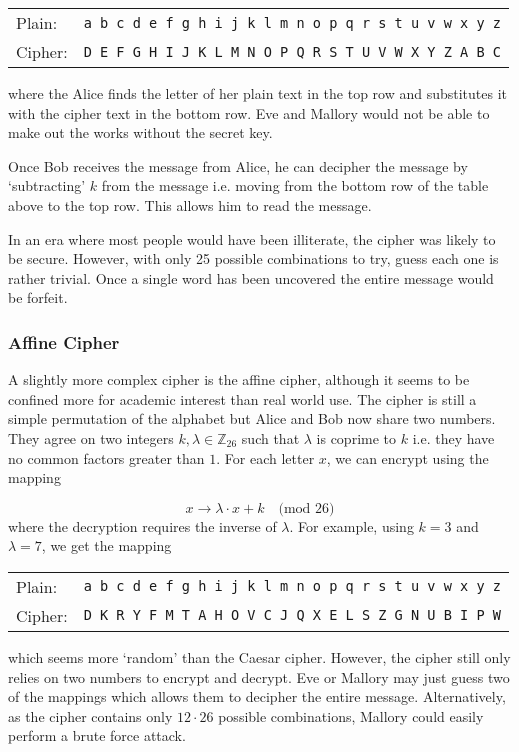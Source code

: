\begin{center}
\begin{tabular}{l l}%
	Plain:  &\quad\texttt{a b c d e f g h i j k l m n o p q r s t u v w x y z} \\ 
	Cipher: &\quad\texttt{D E F G H I J K L M N O P Q R S T U V W X Y Z A B C} \\
\end{tabular}
\end{center}
where the Alice finds the letter of her plain text in the top row and substitutes it with the cipher text in the bottom row. Eve and Mallory would not be able to make out the works without the secret key. 

Once Bob receives the message from Alice, he can decipher the message by `subtracting' $k$ from the message i.e. moving from the bottom row of the table above to the top row. This allows him to read the message.

In an era where most people would have been illiterate, the cipher was likely to be secure. However, with only 25 possible combinations to try, guess each one is rather trivial. Once a single word has been uncovered the entire message would be forfeit. 

\subsubsection*{Affine Cipher}

A slightly more complex cipher is the affine cipher, although it seems to be confined more for academic interest than real world use. The cipher is still a simple permutation of the alphabet but Alice and Bob now share two numbers. They agree on two integers $k,\lambda\in \mathbb{Z}_{26}$ such that $\lambda$ is coprime to $k$ i.e. they have no common factors greater than $1$. For each letter $x$, we can encrypt using the mapping

\begin{equation}
	x \rightarrow \lambda \cdot x + k\quad\text{(mod 26)}
\end{equation}
where the decryption requires the inverse of $\lambda$. For example, using $k = 3$ and $\lambda = 7$, we get the mapping

\begin{center}
\begin{tabular}{l l}
	Plain:  &\quad\texttt{a b c d e f g h i j k l m n o p q r s t u v w x y z} \\ 
	Cipher: &\quad\texttt{D K R  Y F M T A H O V C J Q X E L S Z G N U B I P W} \\
\end{tabular}
\end{center}
which seems more `random' than the Caesar cipher. However, the cipher still only relies on two numbers to encrypt and decrypt. Eve or Mallory may just guess two of the mappings which allows them to decipher the entire message. Alternatively, as the cipher contains only $12 \cdot 26$ possible combinations, Mallory could easily perform a brute force attack.

